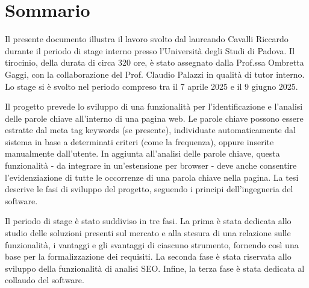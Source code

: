 \cleardoublepage
{}
{}
\begingroup
\let\clearpage\relax
\let\cleardoublepage\relax
\let\cleardoublepage\relax

\chapter*{Sommario}

\par Il presente documento illustra il lavoro svolto dal laureando Cavalli Riccardo durante il periodo di stage interno presso l’Università degli Studi di Padova. Il tirocinio, della durata di circa 320 ore, è stato assegnato dalla Prof.ssa Ombretta Gaggi, con la collaborazione del Prof. Claudio Palazzi in qualità di tutor interno. Lo stage si è svolto nel periodo compreso tra il 7 aprile 2025 e il 9 giugno 2025.

\vspace{10pt}
\par\noindent Il progetto prevede lo sviluppo di una funzionalità per l’identificazione e l’analisi delle parole chiave all’interno di una pagina web. Le parole chiave possono essere estratte dal meta tag keywords (se presente), individuate automaticamente dal sistema in base a determinati criteri (come la frequenza), oppure inserite manualmente dall’utente. In aggiunta all’analisi delle parole chiave, questa funzionalità - da integrare in un’estensione per browser - deve anche consentire l’evidenziazione di tutte le occorrenze di una parola chiave nella pagina. La tesi descrive le fasi di sviluppo del progetto, seguendo i principi dell’ingegneria del software.

\vspace{10pt}
\par\noindent Il periodo di stage è stato suddiviso in tre fasi. La prima è stata dedicata allo studio delle soluzioni presenti sul mercato e alla stesura di una relazione sulle funzionalità, i vantaggi e gli svantaggi di ciascuno strumento, fornendo così una base per la formalizzazione dei requisiti. La seconda fase è stata riservata allo sviluppo della funzionalità di analisi SEO. Infine, la terza fase è stata dedicata al collaudo del software.




\endgroup

\vfill
